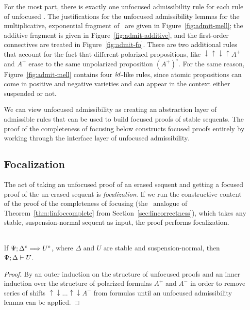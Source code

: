 For the most part, there is exactly one unfocused admissibility rule
for each rule of unfocused \ollll. 
The justifications for the 
unfocused admissibility lemmas for the multiplicative, exponential
fragment of \ollll~are given in Figure~\ref{fig:admit-mell}; the
additive fragment is given in Figure~\ref{fig:admit-additive}, and
the first-order connectives are treated in Figure~\ref{fig:admit-fo}.
There are two additional
rules that account for the fact that different polarized
propositions, like ${\downarrow}{\uparrow}{\downarrow}{\uparrow}A^+$
and $A^+$ erase to the same unpolarized proposition
$(A^+)^\circ$. 
For the same reason, Figure~\ref{fig:admit-mell} contains four
${\it id}$-like rules, since atomic propositions can come in positive
and negative varieties and can appear in the context either suspended or not.

We can view unfocused admissibility as creating an abstraction layer
of admissible rules that can be used to build focused proofs of stable
sequents.  The proof of the completeness of focusing below constructs
focused proofs entirely by working through the interface layer of
unfocused admissibility.


\subsection{Focalization}

The act of taking an unfocused proof of an erased sequent and getting
a focused proof of the un-erased sequent is {\it focalization}. If 
we run the constructive content of the proof of the completeness of
focusing (the \ollll~analogue of Theorem~\ref{thm:linfoccomplete} from
Section~\ref{sec:lincorrectness}), which takes any stable, 
suspension-normal sequent as input, the proof performs focalization.

\bigskip
\begin{theorem}~\\
If $\Psi; \Delta^\circ \Longrightarrow U^\circ$, where $\Delta$ and $U$ are 
stable and suspension-normal, then ${\Psi};{\Delta} \vdash {U} \mathstrut$. 
\end{theorem}

\begin{proof}
By an outer induction on the structure of unfocused proofs and
an inner induction over the structure of polarized formulas $A^+$ and
$A^-$ in order to remove series of shifts 
${\uparrow}{\downarrow}\ldots{\uparrow}{\downarrow}A^-$ from formulas until
an unfocused admissibility lemma can be applied.
\end{proof}

